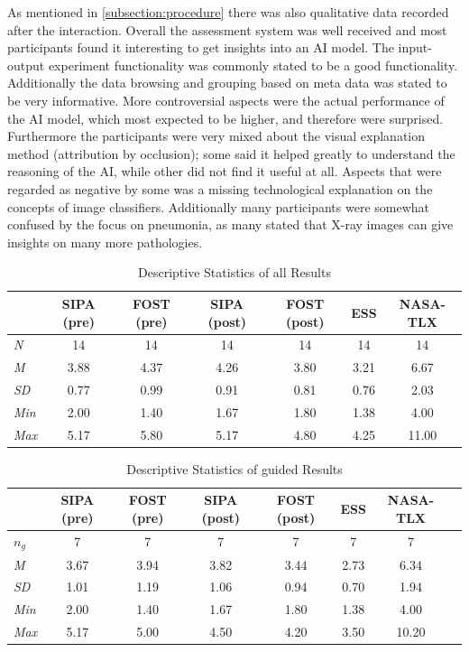\documentclass[11pt,a4paper,english]{scrreprt}
\begin{document}
As mentioned in \autoref{subsection:procedure} there was also qualitative data recorded after the interaction. Overall the assessment system was well received and most participants found it interesting to get insights into an AI model. The input-output experiment functionality was commonly stated to be a good functionality. Additionally the data browsing and grouping based on meta data was stated to be very informative. More controversial aspects were the actual performance of the AI model, which most expected to be higher, and therefore were surprised. Furthermore the participants were very mixed about the visual explanation method (attribution by occlusion); some said it helped greatly to understand the reasoning of the AI, while other did not find it useful at all. Aspects that were regarded as negative by some was a missing technological explanation on the concepts of image classifiers. Additionally many participants were somewhat confused by the focus on pneumonia, as many stated that X-ray images can give insights on many more pathologies.

\begin{table}[htbp]
    \centering
    \begin{tabularx}{\textwidth}{ l c c c c c c }
        \toprule
        & SIPA (pre) & FOST (pre) & SIPA (post) & FOST (post) & ESS & NASA-TLX \\
        \midrule
        \textit{N} & 14 & 14 & 14 & 14 & 14 & 14 \\
        \textit{M} & 3.88 & 4.37 & 4.26 & 3.80 & 3.21 & 6.67 \\
        \textit{SD} & 0.77 & 0.99 & 0.91 & 0.81 & 0.76 & 2.03 \\
        \textit{Min} & 2.00 & 1.40 & 1.67 & 1.80 & 1.38 & 4.00 \\
        \textit{Max} & 5.17 & 5.80 & 5.17 & 4.80 & 4.25 & 11.00 \\
        \bottomrule
    \end{tabularx}
    \caption{Descriptive Statistics of all Results}
    \label{table:evaluation_descriptive}
\end{table}

\begin{table}[htbp]
    \centering
    \begin{tabularx}{\textwidth}{ l c c c c c c c }
        \toprule
        & SIPA (pre) & FOST (pre) & SIPA (post) & FOST (post) & ESS & NASA-TLX \\
        \midrule
        \textit{$n_g$} & 7 & 7 & 7 & 7 & 7 & 7 \\
        \textit{M} & 3.67 & 3.94 & 3.82 & 3.44 & 2.73 & 6.34 \\
        \textit{SD} & 1.01 & 1.19 & 1.06 & 0.94 & 0.70 & 1.94 \\
        \textit{Min} & 2.00 & 1.40 & 1.67 & 1.80 & 1.38 & 4.00 \\
        \textit{Max} & 5.17 & 5.00 & 4.50 & 4.20 & 3.50 & 10.20 \\
        \bottomrule
    \end{tabularx}
    \caption{Descriptive Statistics of guided Results}
    \label{table:evaluation_descriptive_guided}
\end{table}
\end{document}
